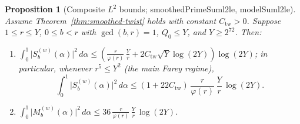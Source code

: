 \documentclass[11pt,reqno]{amsart}
\numberwithin{equation}{section}
\newtheorem{proposition}[theorem]{Proposition}
\theoremstyle{definition}
\newcommand{\1}{\mathbf{1}}
\newcommand{\lean}[1]{{\footnotesize\ttfamily\renewcommand{\_}{\textunderscore\allowbreak}#1}}
\begin{document}
\begin{proposition}[Composite $L^2$ bounds; \lean{smoothedPrimeSum\_l2\_le}, \lean{modelSum\_l2\_le}]
\label{prop:l2-bounds}
Assume Theorem~\ref{thm:smoothed-twist} holds with constant $C_{\mathrm{tw}} > 0$. Suppose $1 \le r \le Y$, $0 \le b < r$ with $\gcd(b, r) = 1$, $Q_0 \le Y$, and $Y \ge 2^{72}$. Then:
\begin{enumerate}[label=(\alph*)]
  \item $\displaystyle \int_0^1 \bigl|S_b^{(w)}(\alpha)\bigr|^2\,d\alpha \le \left(\frac{r}{\varphi(r)}\,\frac{Y}{r} + 2 C_{\mathrm{tw}} \sqrt{Y}\log(2Y)\right)\log(2Y)$; in particular, whenever $r^5 \le Y^2$ (the main Farey regime),
  \[
    \int_0^1 \bigl|S_b^{(w)}(\alpha)\bigr|^2\,d\alpha \le (1 + 22 C_{\mathrm{tw}})\,\frac{r}{\varphi(r)}\,\frac{Y}{r}\,\log(2Y).
  \]
  \item $\displaystyle \int_0^1 \bigl|M_b^{(w)}(\alpha)\bigr|^2\,d\alpha \le 36\,\frac{r}{\varphi(r)}\,\frac{Y}{r}\,\log(2Y)$.
\end{enumerate}
\end{proposition}
\end{document}

